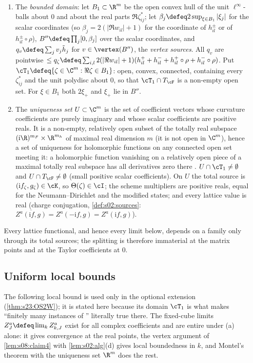 \begin{definition}
\begin{enumerate}[label=\textup{(\roman*)},leftmargin=*,nosep]
\item The \emph{bounded domain}: let $B_1\subset\R^m$ be the open convex hull of the unit $\ell^\infty$-balls about $0$ and about the real parts $\Re\zeta^*_{ij}$; let $\beta_j\defeq2\sup_{\xi\in B_1}|\xi_j|$ for the scalar coordinates (so $\beta_j=2(|\Re w_{il}|+1)$ for the coordinate of $h^\pm_{il}$ or of $h^\pm_{il}\circ\rho$), $B''\defeq\prod_j[0,\beta_j]$ over the scalar coordinates, and $q_v\defeq\sum_jv_j\tilde h_j$ for $v\in\vertex(B'')$, the \emph{vertex sources}. All $q_v$ are pointwise $\le q_\zeta\defeq\sum_{i,l}2(|\Re w_{il}|+1)(h^+_{il}+h^-_{il}+h^+_{il}\circ\rho+h^-_{il}\circ\rho)$. Put $\cT_1\defeq\{\zeta\in\C^m:\Re\zeta\in B_1\}$: open, convex, connected, containing every $\zeta^*_{ij}$ and the unit polydisc about $0$, so that $\cT_1\cap T_\cF$ is a non-empty open set. For $\xi\in B_1$ both $2\xi_+$ and $\xi_+$ lie in $B''$.
\item The \emph{uniqueness set} $U\subset\C^m$ is the set of coefficient vectors whose curvature coefficients are purely imaginary and whose scalar coefficients are positive reals. It is a non-empty, relatively open subset of the totally real subspace $(\mathrm i\R)^{m_F}\times\R^{m_h}$ of maximal real dimension $m$ (it is not open in $\C^m$), hence a set of uniqueness for holomorphic functions on any connected open set meeting it: a holomorphic function vanishing on a relatively open piece of a maximal totally real subspace has all derivatives zero there \cite{Hor90}. $U\cap\cT_1\ne\emptyset$ and $U\cap T_\cF\ne\emptyset$ (small positive scalar coefficients). On $U$ the total source is $(\mathrm if_\zeta,g_\zeta)\in\cK$, so $\Theta(\zeta)\in\cI$; the scheme multipliers are positive reals, equal for the Neumann--Dirichlet and the modified states; and every lattice value is real (charge conjugation, \cref{def:s02:sources}: $\overline{Z^a(\mathrm if,g)}=Z^a(-\mathrm if,g)=Z^a(\mathrm if,g)$).
\end{enumerate}
Every lattice functional, and hence every limit below, depends on a family only through its total sources; the splitting is therefore immaterial at the matrix points and at the Taylor coefficients at $0$.
\end{definition}

\subsection{Uniform local bounds}

The following local bound is used only in the optional extension (\cref{thm:s23:OS2W}); it is stated here because its domain $\cT_1$ is what makes ``finitely many instances of \Wtwo'' literally true there. The fixed-cube limits $Z^a_J\defeq\lim_kZ^a_{k,J}$ exist for all complex coefficients and are entire under \Wtwo(a) alone: it gives convergence at the real points, the vertex argument of \cref{lem:s08:claim4} with \cref{lem:s02:alg}(d) gives local boundedness in $k$, and Montel's theorem with the uniqueness set $\R^m$ does the rest.

